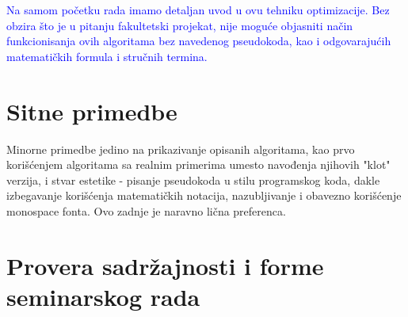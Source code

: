 \documentclass[a4paper]{report}
\newcommand{\odgovor}[1]{\textcolor{blue}{#1}}
\begin{document}
\odgovor{Na samom početku rada imamo detaljan uvod u ovu tehniku optimizacije. Bez obzira što je u pitanju fakultetski projekat, nije moguće objasniti način funkcionisanja ovih algoritama bez navedenog pseudokoda, kao i odgovarajućih matematičkih formula i stručnih termina.}

\section{Sitne primedbe}
Minorne primedbe jedino na prikazivanje opisanih algoritama, kao prvo korišćenjem algoritama sa realnim primerima umesto navođenja njihovih "klot" verzija, 
i stvar estetike - pisanje pseudokoda u stilu programskog koda, dakle izbegavanje korišćenja matematičkih notacija, nazubljivanje i obavezno korišćenje 
monospace fonta. Ovo zadnje je naravno lična preferenca.


\section{Provera sadržajnosti i forme seminarskog rada}
\end{document}
